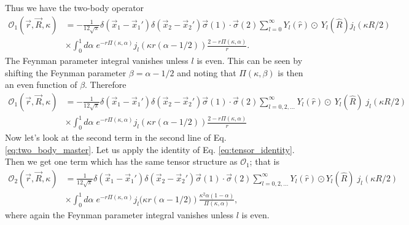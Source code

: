 \documentclass{book}[12pt]
\begin{document}
Thus we have the two-body operator
\begin{equation}
\begin{split}
\mathcal{O}_1(\vec{r},\vec{R},\kappa)&=-\frac{1}{12\sqrt{\pi}}\delta(\vec{x}_1-\vec{x}_1')\delta(\vec{x}_2-\vec{x}_2')\vec{\sigma}(1)\cdot\vec{\sigma}(2)\sum_{l=0}^{\infty}Y_l(\hat{r})\odot\ Y_l(\hat{R})j_l(\kappa R/2)\\
&\times\int_0^1d\alpha\;e^{-r\Pi(\kappa,\alpha)}j_l\left(\kappa r(\alpha-1/2)\right)\frac{2-r\Pi(\kappa,\alpha)}{r}.
\end{split}
\end{equation}
The Feynman parameter integral vanishes unless $l$ is even. This can be seen by shifting the Feynman parameter $\beta=\alpha-1/2$ and noting that $\Pi(\kappa,\beta)$ is then an even function of $\beta$. Therefore
\begin{equation}
\begin{split}
\mathcal{O}_1(\vec{r},\vec{R},\kappa)&=-\frac{1}{12\sqrt{\pi}}\delta(\vec{x}_1-\vec{x}_1')\delta(\vec{x}_2-\vec{x}_2')\vec{\sigma}(1)\cdot\vec{\sigma}(2)\sum_{l=0,2,...}^{\infty}Y_l(\hat{r})\odot\ Y_l(\hat{R})\;j_l(\kappa R/2)\\
&\times\int_0^1d\alpha\;e^{-r\Pi(\kappa,\alpha)}j_l\left(\kappa r(\alpha-1/2)\right)\frac{2-r\Pi(\kappa,\alpha)}{r}
\end{split}
\end{equation}
Now let's look at the second term in the second line of Eq. \ref{eq:two_body_master}. Let us apply the identity of Eq. \ref{eq:tensor_identity}. Then we get one term which has the same tensor structure as $\mathcal{O}_1$; that is
\begin{equation}
\begin{split}
\mathcal{O}_2(\vec{r},\vec{R},\kappa)&=\frac{1}{12\sqrt{\pi}}\delta(\vec{x}_1-\vec{x}_1')\delta(\vec{x}_2-\vec{x}_2')\vec{\sigma}(1)\cdot\vec{\sigma}(2)\sum_{l=0,2,...}^{\infty}Y_l(\hat{r})\odot Y_l(\hat{R})\;j_l(\kappa R/2)\\
&\times\int_0^1 d\alpha\;e^{-r\Pi(\kappa,\alpha)}j_l(\kappa r\left(\alpha-1/2)\right)\frac{\kappa^2\alpha(1-\alpha)}{\Pi(\kappa,\alpha)},
\end{split}
\end{equation}
where again the Feynman parameter integral vanishes unless $l$ is even. 
\end{document}
